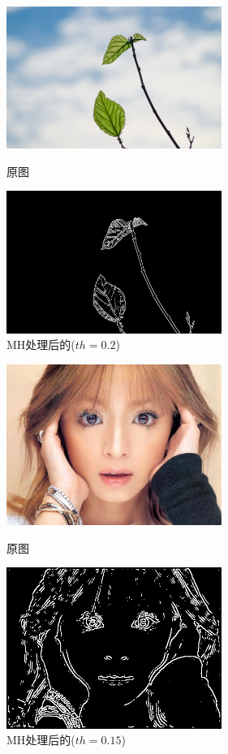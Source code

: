 \documentclass[11pt, a4paper, UTF8]{ctexart}
\begin{document}
\begin{figure}[H]
  \centering
  \begin{minipage}[t]{0.48\textwidth}
  \centering
  \includegraphics[width=7cm]{leaf.jpg}
  \caption{原图}
  \end{minipage}
  \begin{minipage}[t]{0.48\textwidth}
  \centering
  \includegraphics[width=7cm]{MH_alpha=0.2_leaf.png}
  \caption{MH处理后的($th=0.2$)}
  \end{minipage}
\end{figure}


\begin{figure}[H]
  \centering
  \begin{minipage}[t]{0.48\textwidth}
  \centering
  \includegraphics[width=7cm]{ayu.jpg}
  \caption{原图}
  \end{minipage}
  \begin{minipage}[t]{0.48\textwidth}
  \centering
  \includegraphics[width=7cm]{MH_alpha=0.15_ayu.png}
  \caption{MH处理后的($th=0.15$)}
  \end{minipage}
\end{figure}
\end{document}
